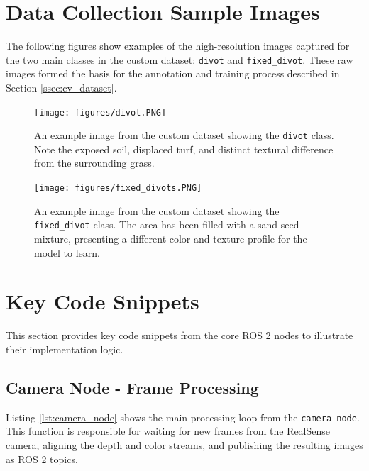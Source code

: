 
\section{Data Collection Sample Images}
\label{sec:appendix_dataset_samples}
The following figures show examples of the high-resolution images captured for the two main classes in the custom dataset: \texttt{divot} and \texttt{fixed\_divot}. These raw images formed the basis for the annotation and training process described in Section \ref{ssec:cv_dataset}.

\begin{figure}[h!]
    \centering
    \texttt{[image: figures/divot.PNG]}
    \caption[Sample Image of \texttt{divot} Class.]
    {An example image from the custom dataset showing the \texttt{divot} class. Note the exposed soil, displaced turf, and distinct textural difference from the surrounding grass.}
    \label{fig:appendix_divot_sample}
\end{figure}

\begin{figure}[h!]
    \centering
    \texttt{[image: figures/fixed\_divots.PNG]}
    \caption[Sample Image of \texttt{fixed\_divot} Class.]
    {An example image from the custom dataset showing the \texttt{fixed\_divot} class. The area has been filled with a sand-seed mixture, presenting a different color and texture profile for the model to learn.}
    \label{fig:appendix_fixed_divot_sample}
\end{figure}


\section{Key Code Snippets}
\label{sec:appendix_code}
This section provides key code snippets from the core ROS 2 nodes to illustrate their implementation logic.

\subsection{Camera Node - Frame Processing}
Listing \ref{lst:camera_node} shows the main processing loop from the \texttt{camera\_node}. This function is responsible for waiting for new frames from the RealSense camera, aligning the depth and color streams, and publishing the resulting images as ROS 2 topics.


